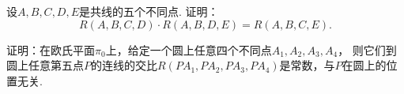 \begin{example}
设\(A,B,C,D,E\)是共线的五个不同点.
证明：\begin{equation*}
	R(A,B,C,D) \cdot R(A,B,D,E) = R(A,B,C,E).
\end{equation*}
\end{example}

\begin{example}
证明：在欧氏平面\(\pi_0\)上，给定一个圆上任意四个不同点\(A_1,A_2,A_3,A_4\)，
则它们到圆上任意第五点\(P\)的连线的交比\(R(PA_1,PA_2,PA_3,PA_4)\)是常数，与\(P\)在圆上的位置无关.
\end{example}
